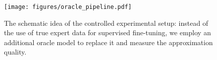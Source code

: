 
\begin{figure}
    \centering
    \texttt{[image: figures/oracle\_pipeline.pdf]}
    \caption{The schematic idea of the controlled experimental setup: instead of the use of true expert data for supervised fine-tuning, we employ an additional oracle model to replace it and measure the approximation quality.}
    \label{fig:oracle_pipeline}
\end{figure}


